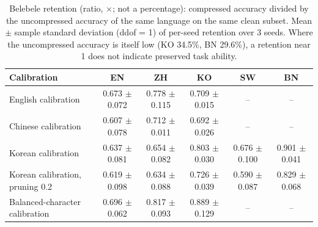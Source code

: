 \begin{table}[t]
\centering
\small
\begin{tabular}{lccccc}
\toprule
Calibration & EN & ZH & KO & SW & BN \\
\midrule
English calibration & 0.673 $\pm$ 0.072 & 0.778 $\pm$ 0.115 & 0.709 $\pm$ 0.015 & -- & -- \\
Chinese calibration & 0.607 $\pm$ 0.078 & 0.712 $\pm$ 0.011 & 0.692 $\pm$ 0.026 & -- & -- \\
Korean calibration & 0.637 $\pm$ 0.081 & 0.654 $\pm$ 0.082 & 0.803 $\pm$ 0.030 & 0.676 $\pm$ 0.100 & 0.901 $\pm$ 0.041 \\
Korean calibration, pruning 0.2 & 0.619 $\pm$ 0.098 & 0.634 $\pm$ 0.088 & 0.726 $\pm$ 0.039 & 0.590 $\pm$ 0.087 & 0.829 $\pm$ 0.068 \\
Balanced-character calibration & 0.696 $\pm$ 0.062 & 0.817 $\pm$ 0.093 & 0.889 $\pm$ 0.129 & -- & -- \\
\bottomrule
\end{tabular}
\caption{Belebele retention (ratio, $\times$; not a percentage): compressed accuracy divided by the uncompressed accuracy of the same language on the same clean subset. Mean $\pm$ sample standard deviation (ddof = 1) of per-seed retention over 3 seeds. Where the uncompressed accuracy is itself low (KO 34.5\%, BN 29.6\%), a retention near 1 does not indicate preserved task ability.}
\label{tab:belebele-retention}
\end{table}
